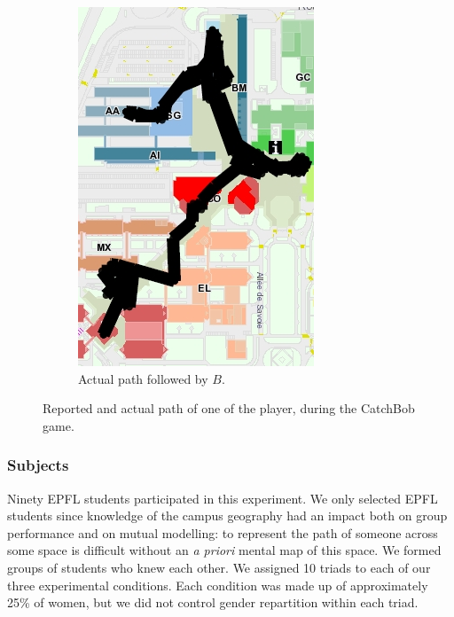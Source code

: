 \documentclass[natbib]{svjour3}
\begin{document}
\begin{figure}[h!t]
\begin{subfigure}{.4\textwidth}
            \includegraphics[width=\linewidth]{image7.png}
            \caption{Actual path followed by $B$.}
        \end{subfigure}
        \caption{Reported and actual path of one of the player, during the {\sc
        CatchBob} game.}
        \label{study2:paths}
\end{figure}

\subsubsection*{Subjects}

Ninety EPFL students participated in this experiment. We only selected EPFL
students since knowledge of the campus geography had an impact both on group
performance and on mutual modelling: to represent the path of someone across
some space is difficult without an \textit{a priori} mental map of this space.
We formed groups of students who knew each other. We assigned 10 triads to each
of our three experimental conditions. Each condition was made up of
approximately 25\% of women, but we did not control gender repartition within
each triad.
\end{document}
